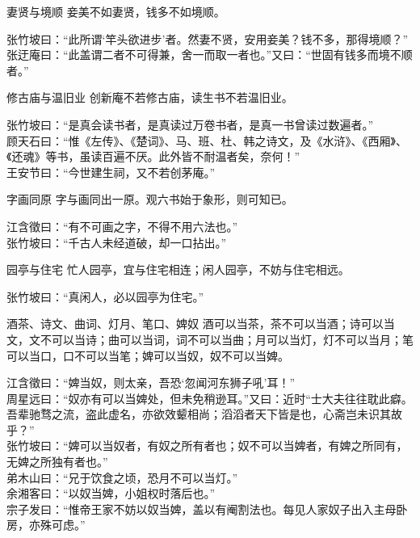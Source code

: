 \begin{yulu}{妻贤与境顺}
妾美不如妻贤，钱多不如境顺。
\begin{comments}
张竹坡曰：“此所谓‘竿头欲进步’者。然妻不贤，安用妾美？钱不多，那得境顺？” \\
张迂庵曰：“此盖谓二者不可得兼，舍一而取一者也。”又曰：“世固有钱多而境不顺者。”
\end{comments}
\end{yulu}

\begin{yulu}{修古庙与温旧业}
创新庵不若修古庙，读生书不若温旧业。
\begin{comments}
张竹坡曰：“是真会读书者，是真读过万卷书者，是真一书曾读过数遍者。” \\
顾天石曰：“惟《左传》、《楚词》、马、班、杜、韩之诗文，及《水浒》、《西厢》、《还魂》等书，虽读百遍不厌。此外皆不耐温者矣，奈何！” \\
王安节曰：“今世建生祠，又不若创茅庵。”
\end{comments}
\end{yulu}

\begin{yulu}{字画同原}
字与画同出一原。观六书始于象形，则可知已。
\begin{comments}
江含徵曰：“有不可画之字，不得不用六法也。” \\
张竹坡曰：“千古人未经道破，却一口拈出。”
\end{comments}
\end{yulu}

\begin{yulu}{园亭与住宅}
忙人园亭，宜与住宅相连；闲人园亭，不妨与住宅相远。
\begin{comments}
张竹坡曰：“真闲人，必以园亭为住宅。”
\end{comments}
\end{yulu}

\begin{yulu}{酒茶、诗文、曲词、灯月、笔口、婢奴}
酒可以当茶，茶不可以当酒；诗可以当文，文不可以当诗；曲可以当词，词不可以当曲；月可以当灯，灯不可以当月；笔可以当口，口不可以当笔；婢可以当奴，奴不可以当婢。
\begin{comments}
江含徵曰：“婢当奴，则太亲，吾恐‘忽闻河东狮子吼’耳！” \\
周星远曰：“奴亦有可以当婢处，但未免稍逊耳。”又曰：近时“士大夫往往耽此癖。吾辈驰骛之流，盗此虚名，亦欲效颦相尚；滔滔者天下皆是也，心斋岂未识其故乎？” \\
张竹坡曰：“婢可以当奴者，有奴之所有者也；奴不可以当婢者，有婢之所同有，无婢之所独有者也。” \\
弟木山曰：“兄于饮食之顷，恐月不可以当灯。” \\
余湘客曰：“以奴当婢，小姐权时落后也。” \\
宗子发曰：“惟帝王家不妨以奴当婢，盖以有阉割法也。每见人家奴子出入主母卧房，亦殊可虑。”
\end{comments}
\end{yulu}

